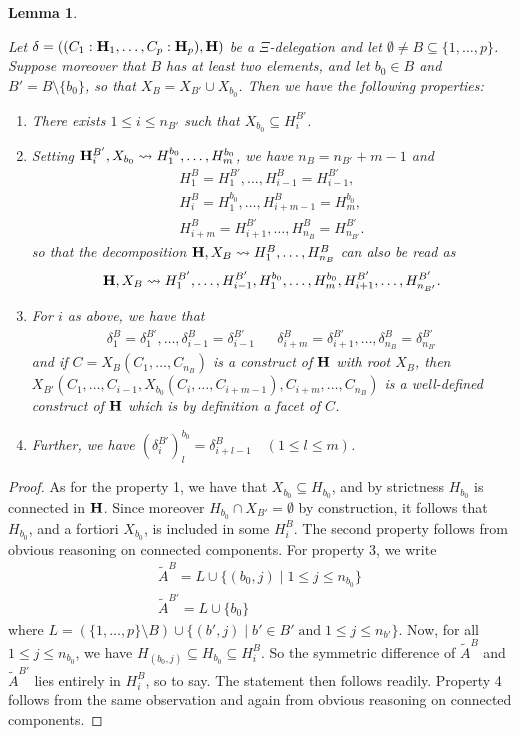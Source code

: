\documentclass{article}
\theoremstyle{plain}
\newtheorem{lemma}[thm]{Lemma}
\theoremstyle{definition}
\newcommand{\inc}{\subseteq}
\newcommand{\set}[1]{\{#1\}}
\newcommand{\setc}[2]{\set{#1 \mid #2}}
\newcommand{\hyper}[1]{{\bf #1}}
\begin{document}
\begin{lemma} \label{subface-decomp}

Let $\delta=((C_1:{\bf H}_1,\dots, C_p:{\bf H}_p),{\bf H})$ be a 
 $\Xi$-delegation and let $\emptyset\neq B\subseteq \{1,\dots,p\}$. Suppose moreover that $B$ 
has at least two elements, and let $b_0\in B$ and $B'=B\setminus\set{b_0}$, so that
$X_B=X_{B'}\cup X_{b_0}$. Then we have the following properties:
\begin{enumerate}
\item
 There exists $1\leq i\leq n_{B'}$ such that $X_{b_0}\inc H_i^{B'}$.
 \item Setting $\hyper{H}_i^{B'}, X_{b_0}\leadsto H_1^{b_0},\ldots,H_m^{b_0}$, we have $n_B=n_{B'}+m-1$ and
 $$\begin{array}{c}
 H_1^B=H_1^{B'}, \dots , H_{i-1}^B=H_{i-1}^{B'}, \\
 H_i^B=H_1^{b_0} ,\dots , H_{i+m-1}^B=H_m^{b_0},\\
 H_{i+m}^B=H_{i+1}^{B'} , \dots , H_{n_B}^B=H_{n_{B'}}^{B'}.
 \end{array}$$
 so that the decomposition $\hyper{H}, X_B\leadsto H^B_1,\ldots,H^B_{n_B}$ can also be read as
 $$\hyper{H}, X_B\leadsto H^{B'}_1,\ldots,H^{B'}_{i-1},H^{b_0}_1,\ldots ,H^{b_0}_m,H^{B'}_{i+1},\ldots,H^{B'}_{n_{B'}}.$$
 \item For $i$ as above, we have that
 $$\begin{array}{lll}
 \delta_1^B=\delta_1^{B'},\ldots, \delta_{i-1}^B=\delta_{i-1}^{B'} &&
 \delta_{i+m}^B=\delta_{i+1}^{B'}, \ldots, \delta_{n_B}^B=\delta_{n_{B'}}^{B'}
 \end{array}$$
 and if $C=X_B(C_1,\ldots,C_{n_B})$ is a construct of $\hyper{H}$ with root $X_B$, then
 $X_{B'}(C_1,\ldots,C_{i-1},X_{b_0}(C_i,\ldots,C_{i+m-1}),C_{i+m},\ldots, C_{n_B})$ is a well-defined construct of
 $\hyper{H}$ which is by definition a facet of $C$.

 
 \item Further, 
 we have
 $(\delta_i^{B'})_l^{b_0}= \delta_{i+l-1}^B \quad (1\leq l\leq m)$.
 \end{enumerate}
\end{lemma}
\begin{proof}
As for the property 1, we have that $X_{b_0}\inc H_{b_0}$, and by strictness $H_{b_0}$ is connected in $\hyper{H}$. Since moreover $H_{b_0}\cap X_{B'}=\emptyset$ by construction, it follows that $H_{b_0}$, and a fortiori $X_{b_0}$, is included in some $H_i^B$.
The second property follows from obvious reasoning on connected components. For property 3, we write 
$$\begin{array}{lll}
\tilde A^B=L \cup\setc{(b_0,j)}{1\leq j\leq n_{b_0}}\\
\tilde A^{B'}= L\cup\set{b_0}
\end{array}$$
where $L=(\{1,\dots,p\}\setminus B)\cup\setc{(b',j)}{b'\in B'\;\textrm{and}\;1\leq j\leq n_{b'}}$. Now, for all 
$1\leq j\leq n_{b_0}$, we have $H_{(b_0,j)}\inc H_{b_0}\inc H_i^B$. So the symmetric difference of 
$\tilde A^B$ and $\tilde A^{B'}$ lies entirely in $H_i^B$, so to say. The statement then follows readily.
Property 4 follows from the same observation and again from obvious reasoning on connected components.
\end{proof}
\end{document}
